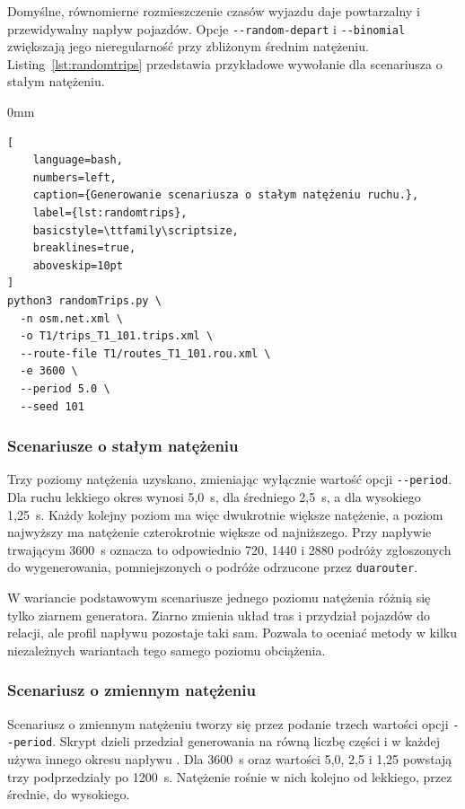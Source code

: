 Domyślne, równomierne rozmieszczenie czasów wyjazdu daje powtarzalny i przewidywalny napływ pojazdów. Opcje \texttt{-{}-random-depart} i \texttt{-{}-binomial} zwiększają jego nieregularność przy zbliżonym średnim natężeniu. Listing~\ref{lst:randomtrips} przedstawia przykładowe wywołanie dla scenariusza o stałym natężeniu.

\begin{addmargin}[8mm]{0mm}
\begin{lstlisting}[
    language=bash,
    numbers=left,
    caption={Generowanie scenariusza o stałym natężeniu ruchu.},
    label={lst:randomtrips},
    basicstyle=\ttfamily\scriptsize,
    breaklines=true,
    aboveskip=10pt
]
python3 randomTrips.py \
  -n osm.net.xml \
  -o T1/trips_T1_101.trips.xml \
  --route-file T1/routes_T1_101.rou.xml \
  -e 3600 \
  --period 5.0 \
  --seed 101
\end{lstlisting}
\end{addmargin}

\subsubsection{Scenariusze o stałym natężeniu}
\label{subsubsec:scenariusze-stale}

Trzy poziomy natężenia uzyskano, zmieniając wyłącznie wartość opcji \texttt{-{}-period}. Dla ruchu lekkiego okres wynosi 5,0~s, dla średniego 2,5~s, a dla wysokiego 1,25~s. Każdy kolejny poziom ma więc dwukrotnie większe natężenie, a poziom najwyższy ma natężenie czterokrotnie większe od najniższego. Przy napływie trwającym 3600~s oznacza to odpowiednio 720, 1440 i 2880 podróży zgłoszonych do wygenerowania, pomniejszonych o podróże odrzucone przez \texttt{duarouter}.

W wariancie podstawowym scenariusze jednego poziomu natężenia różnią się tylko ziarnem generatora. Ziarno zmienia układ tras i przydział pojazdów do relacji, ale profil napływu pozostaje taki sam. Pozwala to oceniać metody w kilku niezależnych wariantach tego samego poziomu obciążenia.

\subsubsection{Scenariusz o zmiennym natężeniu}
\label{subsubsec:scenariusz-zmienny}

Scenariusz o zmiennym natężeniu tworzy się przez podanie trzech wartości opcji \texttt{-{}-period}. Skrypt dzieli przedział generowania na równą liczbę części i w każdej używa innego okresu napływu \cite{sumo_randomtrips_docs}. Dla 3600~s oraz wartości 5,0, 2,5 i 1,25 powstają trzy podprzedziały po 1200~s. Natężenie rośnie w nich kolejno od lekkiego, przez średnie, do wysokiego.

